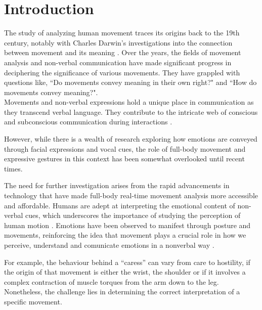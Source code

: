 \chapter{Introduction}
The study of analyzing human movement traces its origins back to the 19th century, notably with Charles Darwin's investigations into the connection between movement and its meaning \cite{darwin}. 
Over the years, the fields of movement analysis and non-verbal communication have made significant progress in deciphering the significance of various movements. 
They have grappled with questions like, “Do movements convey meaning in their own right?" and “How do movements convey meaning?".\\
Movements and non-verbal expressions hold a unique place in communication as they transcend verbal language.
They contribute to the intricate web of conscious and subconscious communication during interactions \cite{Daly:1988, laffaye:2013}.

However, while there is a wealth of research exploring how emotions are conveyed through facial expressions and vocal cues, the role of full-body movement and expressive gestures in this context has been somewhat overlooked until recent times.

The need for further investigation arises from the rapid advancements in technology that have made full-body real-time movement analysis more accessible and affordable. 
Humans are adept at interpreting the emotional content of non-verbal cues, which underscores the importance of studying the perception of human motion \cite{samadani:2011}. 
Emotions have been observed to manifest through posture and movements, reinforcing the idea that movement plays a crucial role in how we perceive, understand and comunicate emotions in a nonverbal way \cite{gelder:2009,kleinsmith:2013,karg:2013}.

For example, the behaviour behind a “caress” can vary from care to hostility, 
if the origin of that movement is either the wrist, the shoulder or if it involves a complex contraction of muscle torques from the arm down to the leg. 
Nonetheless, the challenge lies in determining the correct interpretation of a specific movement.

